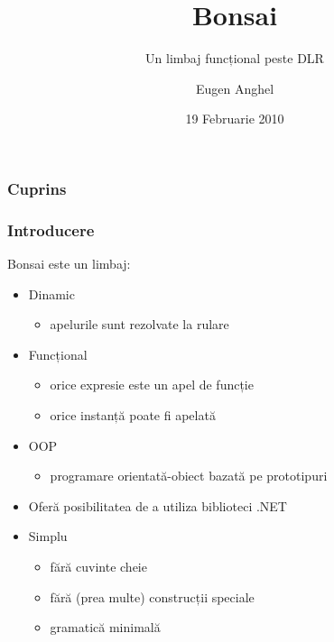 \documentclass{beamer}
\title[Bonsai - un limbaj funcțional peste DLR]{Bonsai}
\subtitle{Un limbaj funcțional peste DLR}
\author{Eugen Anghel}
\institute{Coordonator științific  \\Profesor Doctor Gheorghe Grigoraș}
\date{19 Februarie 2010}
\begin{document}
\frame{\titlepage}

\begin{frame}
  \frametitle{Cuprins}
  \tableofcontents
\end{frame}

\begin{frame}
  \frametitle{Introducere}
  Bonsai este un limbaj:
  \begin{itemize}
  \item 
    Dinamic
    \begin{itemize}
      \item apelurile sunt rezolvate la rulare
    \end{itemize}
  \item 
    Funcțional
    \begin{itemize}
    \item orice expresie este un apel de funcție
    \item orice instanță poate fi apelată
    \end{itemize}
  \item 
    OOP
    \begin{itemize}
    \item programare orientată-obiect bazată pe prototipuri
    \end{itemize}
  \item
    Oferă posibilitatea de a utiliza biblioteci .NET
  \item
    Simplu
    \begin{itemize}
    \item fără cuvinte cheie
    \item fără (prea multe) construcții speciale
    \item gramatică minimală
    \end{itemize}
  \end{itemize}
\end{frame}
\end{document}
